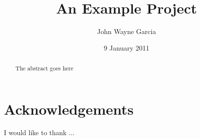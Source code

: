 \documentclass{l3proj}
\begin{document}
\newcommand{\todo}[1]{\textcolor{red}{#1}}
	
	
	\title{An Example Project}
\author{John Wayne Garcia}
\date{9 January 2011}
\maketitle
\begin{abstract}

The abstract goes here

\end{abstract}
\tableofcontents






\section{Acknowledgements}
I would like to thank ...






\end{document}
